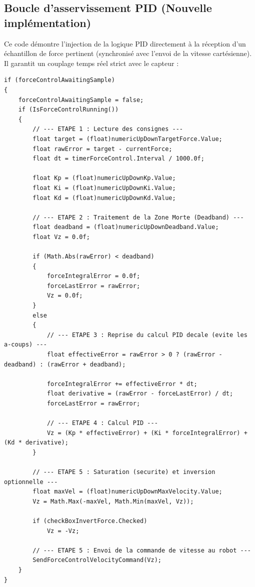 \documentclass[11pt,a4paper]{article}
\begin{document}
\subsection{Boucle d'asservissement PID (Nouvelle impl\'ementation)}
Ce code d\'emontre l'injection de la logique PID directement \`a la r\'eception d'un \'echantillon de force pertinent (synchronis\'e avec l'envoi de la vitesse cart\'esienne). Il garantit un couplage temps r\'eel strict avec le capteur :
\begin{lstlisting}
if (forceControlAwaitingSample)
{
    forceControlAwaitingSample = false;
    if (IsForceControlRunning())
    {
        // --- ETAPE 1 : Lecture des consignes ---
        float target = (float)numericUpDownTargetForce.Value;
        float rawError = target - currentForce;
        float dt = timerForceControl.Interval / 1000.0f;
        
        float Kp = (float)numericUpDownKp.Value;
        float Ki = (float)numericUpDownKi.Value;
        float Kd = (float)numericUpDownKd.Value;
        
        // --- ETAPE 2 : Traitement de la Zone Morte (Deadband) ---
        float deadband = (float)numericUpDownDeadband.Value; 
        float Vz = 0.0f;
        
        if (Math.Abs(rawError) < deadband)
        {
            forceIntegralError = 0.0f;
            forceLastError = rawError;
            Vz = 0.0f;
        }
        else
        {
            // --- ETAPE 3 : Reprise du calcul PID decale (evite les a-coups) ---
            float effectiveError = rawError > 0 ? (rawError - deadband) : (rawError + deadband);
            
            forceIntegralError += effectiveError * dt;
            float derivative = (rawError - forceLastError) / dt;
            forceLastError = rawError;
            
            // --- ETAPE 4 : Calcul PID ---
            Vz = (Kp * effectiveError) + (Ki * forceIntegralError) + (Kd * derivative);
        }
        
        // --- ETAPE 5 : Saturation (securite) et inversion optionnelle ---
        float maxVel = (float)numericUpDownMaxVelocity.Value;
        Vz = Math.Max(-maxVel, Math.Min(maxVel, Vz));
        
        if (checkBoxInvertForce.Checked)
            Vz = -Vz;

        // --- ETAPE 5 : Envoi de la commande de vitesse au robot ---
        SendForceControlVelocityCommand(Vz);
    }
}
\end{lstlisting}
\end{document}
